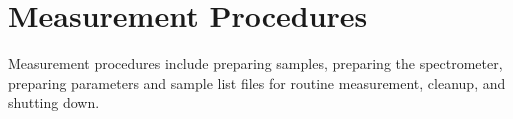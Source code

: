 \section{Measurement Procedures}
Measurement procedures include preparing samples, preparing the spectrometer, preparing parameters and sample list files for routine measurement, cleanup, and shutting down.



